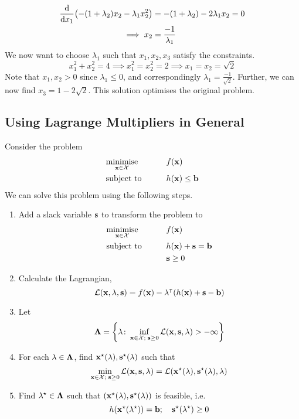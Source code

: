 \begin{example}
	\begin{align*}
		\dv{x_1} (-(1+\lambda_2) x_2 - \lambda_1 x_2^2) & = -(1+\lambda_2) - 2 \lambda_1 x_2 = 0 \\
		\implies x_2                                    & = \frac{-1}{\lambda_1}
	\end{align*}
	We now want to choose \(\lambda_1\) such that \(x_1, x_2, x_3\) satisfy the constraints.
	\[
		x_1^2 + x_2^2 = 4 \implies x_1^2 = x_2^2 = 2 \implies x_1 = x_2 = \sqrt{2}
	\]
	Note that \(x_1, x_2 > 0\) since \(\lambda_1 \leq 0\), and correspondingly \(\lambda_1 = \frac{-1}{\sqrt{2}}\).
	Further, we can now find \(x_3 = 1 - 2\sqrt{2}\).
	This solution optimises the original problem.
\end{example}

\subsection{Using Lagrange Multipliers in General}
Consider the problem
\begin{alignat*}{2}
	 & \underset{\vb x \in \mathcal X}{\text{minimise}} & \qquad & f(\vb x)            \\
	 & \text{subject to}                                &        & h(\vb x) \leq \vb b
\end{alignat*}
We can solve this problem using the following steps.
\begin{enumerate}[(1)]
	\item Add a slack variable \(\vb s\) to transform the problem to
	      \begin{alignat*}{2}
		       & \underset{\vb x \in \mathcal X}{\text{minimise}} & \qquad & f(\vb x)                 \\
		       & \text{subject to}                                &        & h(\vb x) + \vb s = \vb b \\
		       &                                                  &        & \vb s \geq 0
	      \end{alignat*}
	\item Calculate the Lagrangian,
	      \[
		      \mathcal L(\vb x, \vb \lambda, \vb s) = f(\vb x) - \vb \lambda^\intercal (h(\vb x) + \vb s - \vb b)
	      \]
	\item Let
	      \[
		      \vb \Lambda = \qty{\vb \lambda \colon \inf_{\vb x \in \mathcal X;\; \vb s \geq 0} \mathcal L(\vb x, \vb s, \vb \lambda) > -\infty}
	      \]
	\item For each \(\vb\lambda \in \vb\Lambda\), find \(\vb x^\star(\vb \lambda), \vb s^\star(\vb \lambda)\) such that
	      \[
		      \min_{\vb x \in \mathcal X;\; \vb s \geq 0} \mathcal L(\vb x, \vb s, \vb \lambda) = \mathcal L(\vb x^\star(\vb \lambda), \vb s^\star(\vb \lambda), \vb \lambda)
	      \]
	\item Find \(\vb\lambda^\star \in \vb\Lambda\) such that \((\vb x^\star(\vb \lambda), \vb s^\star(\vb \lambda))\) is feasible, i.e.
	      \[
		      h(\vb x^\star(\vb \lambda^\star)) = \vb b;\quad \vb s^\star (\vb \lambda^\star) \geq 0
	      \]
\end{enumerate}

